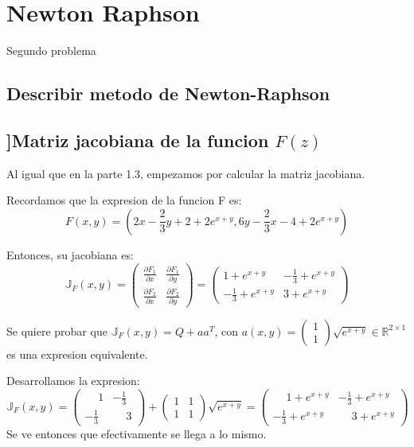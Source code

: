 \documentclass{article}
\begin{document}
    \section{Newton Raphson}
    Segundo problema

    \subsection{Describir metodo de Newton-Raphson}

    \subsection{]Matriz jacobiana de la funcion $F(z)$}
    Al igual que en la parte 1.3, empezamos por calcular la matriz jacobiana.
    
    Recordamos que la expresion de la funcion F es:
    \begin{equation*}
        F(x,y) = \left( 2x - \frac{2}{3}y + 2 + 2e^{x+y}, 6y - \frac{2}{3}x - 4 + 2e^{x+y} \right)
    \end{equation*}

    Entonces, su jacobiana es:
    \begin{equation}
        \mathbb{J}_F(x,y) =
        \begin{pmatrix}
            \frac{\partial F_1}{\partial x} & \frac{\partial F_1}{\partial y} \\
            \frac{\partial F_2}{\partial x} & \frac{\partial F_2}{\partial y}
        \end{pmatrix}
        =
        \begin{pmatrix}
            1 + e^{x+y} & -\frac{1}{3} + e^{x+y} \\
            -\frac{1}{3} + e^{x+y} & 3 + e^{x+y}
        \end{pmatrix}
    \end{equation}

    Se quiere probar que $\mathbb{J}_F(x,y) = Q + aa^T$, con $a(x,y) = \begin{pmatrix} 1\\1 \end{pmatrix}\sqrt{e^{x+y}} \in \mathbb{R}^{2 \times 1}$
    es una expresion equivalente.
    
    Desarrollamos la expresion:
    \begin{equation}
        \mathbb{J}_F(x,y) = 
        \begin{pmatrix}
            \phantom{-}1 & -\frac{1}{3} \\
            -\frac{1}{3} & \phantom{-}3
        \end{pmatrix}
        +
        \begin{pmatrix} 1 & 1 \\ 1 & 1 \end{pmatrix} \sqrt{e^{x+y}}
        =
        \begin{pmatrix}
            \phantom{-}1 + e^{x+y} & -\frac{1}{3} + e^{x+y} \\
            -\frac{1}{3} + e^{x+y} & \phantom{-}3 + e^{x+y}
        \end{pmatrix}
    \end{equation}
    Se ve entonces que efectivamente se llega a lo mismo.
\end{document}

